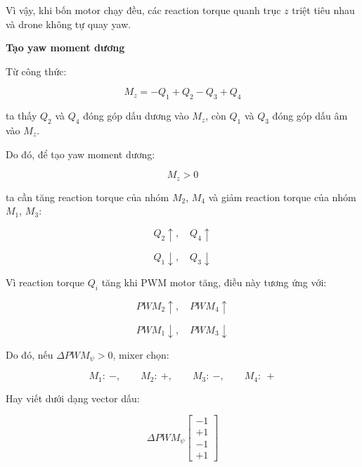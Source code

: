 Vì vậy, khi bốn motor chạy đều, các reaction torque quanh trục $z$ triệt tiêu
nhau và drone không tự quay yaw.

\textbf{Tạo yaw moment dương}

Từ công thức:

\begin{equation}
    M_z = -Q_1 + Q_2 - Q_3 + Q_4
\end{equation}

ta thấy $Q_2$ và $Q_4$ đóng góp dấu dương vào $M_z$, còn $Q_1$ và $Q_3$ đóng
góp dấu âm vào $M_z$.

Do đó, để tạo yaw moment dương:

\begin{equation}
    M_z > 0
\end{equation}

ta cần tăng reaction torque của nhóm $M_2$, $M_4$ và giảm reaction torque của
nhóm $M_1$, $M_3$:

\begin{equation}
    Q_2 \uparrow,\quad Q_4 \uparrow
\end{equation}

\begin{equation}
    Q_1 \downarrow,\quad Q_3 \downarrow
\end{equation}

Vì reaction torque $Q_i$ tăng khi PWM motor tăng, điều này tương ứng với:

\begin{equation}
    PWM_2 \uparrow,\quad PWM_4 \uparrow
\end{equation}

\begin{equation}
    PWM_1 \downarrow,\quad PWM_3 \downarrow
\end{equation}

Do đó, nếu $\Delta PWM_\psi > 0$, mixer chọn:

\begin{equation}
    M_1:\ -,\qquad
    M_2:\ +,\qquad
    M_3:\ -,\qquad
    M_4:\ +
\end{equation}

Hay viết dưới dạng vector dấu:

\begin{equation}
    \Delta PWM_\psi
    \begin{bmatrix}
        -1\\
        +1\\
        -1\\
        +1
    \end{bmatrix}
\end{equation}

